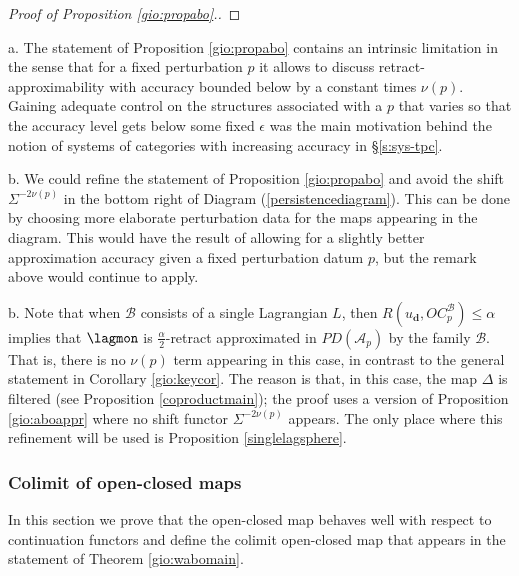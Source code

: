 \begin{proof}[Proof of Proposition \ref{gio:propabo}.]
\end{proof}





\begin{rem}
	a. The statement of Proposition  \ref{gio:propabo} contains an intrinsic limitation in the 
	sense  that for a fixed perturbation $p$ it allows to discuss retract-approximability with accuracy bounded below by a constant times $\nu(p)$. Gaining adequate control on the structures associated with a $p$ that varies so that the accuracy level gets below some fixed $\epsilon$ was the main motivation behind the notion of systems of categories with increasing accuracy in \S\ref{s:sys-tpc}. 
	
	b. We could refine the statement of Proposition \ref{gio:propabo} and avoid the shift $\Sigma^{-2\nu(p)}$ in the bottom right of Diagram (\ref{persistencediagram}). This can be done by choosing more elaborate perturbation data for the maps appearing in the diagram. This would have the result of allowing for a slightly better approximation accuracy given a fixed perturbation datum $p$, but the remark above would continue to apply.
	
	b. Note that when $\mathcal{B}$ consists of a single Lagrangian $L$, then $R(u_\mathbf{d}, OC^\mathcal{B}_p)\leq \alpha$ implies that $\lagmon$ is $\frac{\alpha}{2}$-retract approximated in $PD(\mathcal{A}_p)$ by the family $\mathcal{B}$. That is, there is no $\nu(p)$ term appearing in this case, in contrast to the general statement in Corollary \ref{gio:keycor}. The reason is that, in this case, the map $\Delta$ is filtered (see Proposition \ref{coproductmain}); the proof uses a version of Proposition \ref{gio:aboappr} where no shift functor $\Sigma^{-2\nu(p)}$ appears. The only place where this refinement will be used is Proposition \ref{singlelagsphere}.
\end{rem}
	
	
\subsubsection{Colimit of open-closed maps}

In this section we prove that the open-closed map behaves well with respect to continuation functors and define
the colimit open-closed map that appears in the statement of Theorem \ref{gio:wabomain}.


